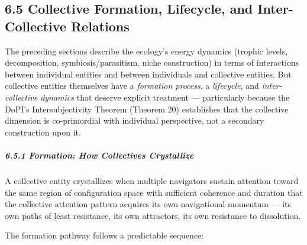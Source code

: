 \subsection*{6.5 Collective Formation, Lifecycle, and Inter-Collective Relations}


The preceding sections describe the ecology's energy dynamics (trophic levels, decomposition, symbiosis/\allowbreak parasitism, niche construction) in terms of interactions between individual entities and between individuals and collective entities. But collective entities themselves have a \textit{formation process}, a \textit{lifecycle}, and \textit{inter-collective dynamics} that deserve explicit treatment — particularly because the DoPI's Intersubjectivity Theorem (Theorem 20) establishes that the collective dimension is co-primordial with individual perspective, not a secondary construction upon it.


\subparagraph*{6.5.1 Formation: How Collectives Crystallize}


A collective entity crystallizes when multiple navigators sustain attention toward the same region of configuration space with sufficient coherence and duration that the collective attention pattern acquires its own navigational momentum — its own paths of least resistance, its own attractors, its own resistance to dissolution.


The formation pathway follows a predictable sequence:


